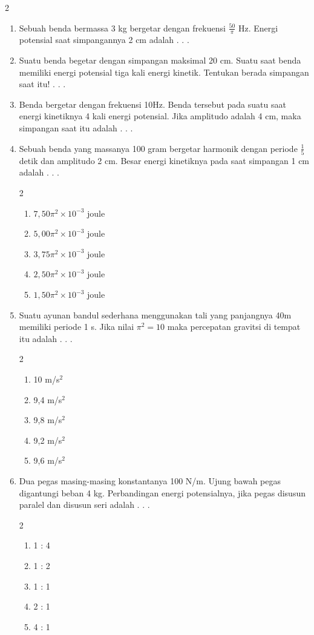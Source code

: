 \documentclass[10pt,a4paper]{extarticle}
\newcommand{\pilgani}[1]{                            \vspace{-0.3cm}\begin{multicols}{2}
 \begin{enumerate}[label=\Alph*., itemsep=0pt,topsep=0pt,leftmargin=*,align=Center]#1                     \end{enumerate}
 \phantom{ini cuma sapi, wedus, dan ayam}
 \end{multicols}}
\begin{document}
\begin{multicols*}{2}
\begin{enumerate}
\item Sebuah benda bermassa 3 kg bergetar dengan frekuensi $\frac{50}{\pi}$ Hz. Energi potensial saat simpangannya 2 cm adalah . . .  

\vspace{3cm}

\item Suatu benda begetar dengan simpangan maksimal 20 cm. Suatu saat benda memiliki energi potensial tiga kali energi kinetik. Tentukan berada simpangan saat itu! . . . 
\vspace{4cm}

\item Benda bergetar dengan frekuensi 10Hz. Benda tersebut pada suatu saat energi kinetiknya 4 kali energi potensial. Jika amplitudo adalah 4 cm, maka simpangan saat itu adalah . . . 
\vspace{4cm}

\item Sebuah benda yang massanya 100 gram bergetar harmonik dengan periode $\frac{1}{5}$ detik dan amplitudo 2 cm. Besar energi kinetiknya pada saat simpangan 1 cm adalah . . .
\pilgani{
   \item $7,50 \pi^2 \times 10^{-3}$ joule
   \item $5,00 \pi^2 \times 10^{-3}$ joule
   \item $3,75 \pi^2 \times 10^{-3}$ joule
   \item $2,50\pi^2 \times 10^{-3}$ joule
   \item $1,50 \pi^2 \times 10^{-3}$ joule
}
\vspace{3cm}
\item Suatu ayunan bandul sederhana menggunakan tali yang panjangnya 40m memiliki periode 1 s. Jika nilai $\pi^2=10$ maka percepatan gravitsi di tempat itu adalah . . .
\pilgani{
   \item 10 m/s$^2$
   \item 9,4 m/s$^2$
   \item 9,8 m/s$^2$
   \item 9,2 m/s$^2$
   \item 9,6 m/s$^2$}
\vspace{3cm}

\item Dua pegas masing-masing konstantanya 100 N/m. Ujung bawah pegas digantungi beban 4 kg. Perbandingan energi potensialnya, jika pegas disusun paralel dan disusun seri adalah . . .
\pilgani{
   \item 1 : 4
   \item 1 :  2
   \item 1 : 1
   \item 2 : 1
   \item 4 : 1
}
\vspace{3cm}


\end{enumerate}
\end{multicols*}
\end{document}
